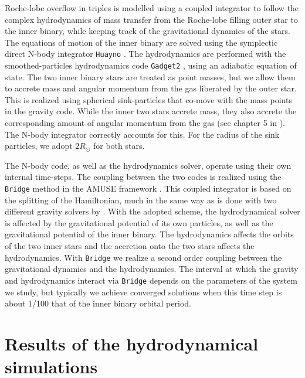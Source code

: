 \documentclass[twocolumn]{aastex62}
\begin{document}
Roche-lobe overflow in triples is modelled using a coupled integrator
to follow the complex hydrodynamics of mass transfer from the
Roche-lobe filling outer star to the inner binary, while keeping track
of the gravitational dynamics of the stars.  The equations of motion
of the inner binary are solved using the symplectic direct N-body
integrator \texttt{Huayno} \citep{2012NewA...17..711P}. The
hydrodynamics are performed with the smoothed-particles hydrodynamics
code \texttt{Gadget2} \citep{2000ascl.soft03001S}, using an adiabatic
equation of state.  The two inner binary stars are treated as point
masses, but we allow them to accrete mass and angular momentum from
the gas liberated by the outer star.  This is realized using spherical
sink-particles that co-move with the mass points in the gravity
code. While the inner two stars accrete mass, they also accrete the
corresponding amount of angular momentum from the gas (see chapter 5
in \cite{AMUSE}).  The N-body integrator correctly accounts for this.
For the radius of the sink particles, we adopt $2 R_\odot$ for both
stars.

The N-body code, as well as the hydrodynamics solver, operate using
their own internal time-steps. The coupling between the two codes is
realized using the \texttt{Bridge} method in the AMUSE framework
\citep[see Sect.\.4.3.1 in][]{2013CoPhC.183..456P}.  This coupled
integrator is based on the splitting of the Hamiltonian, much in the
same way as is done with two different gravity solvers by
\cite{2007PASJ...59.1095F}. With the adopted scheme, the
hydrodynamical solver is affected by the gravitational potential of
its own particles, as well as the gravitational potential of the inner
binary. The hydrodynamics affects the orbits of the two inner stars
and the accretion onto the two stars affects the hydrodynamics. With
\texttt{Bridge} we realize a second order coupling between the
gravitational dynamics and the hydrodynamics.  The interval at which
the gravity and hydrodynamics interact via \texttt{Bridge} depends on
the parameters of the system we study, but typically we achieve
converged solutions when this time step is about 1/100 that of the
inner binary orbital period.

\section{Results of the hydrodynamical simulations} \label{results}
\end{document}
